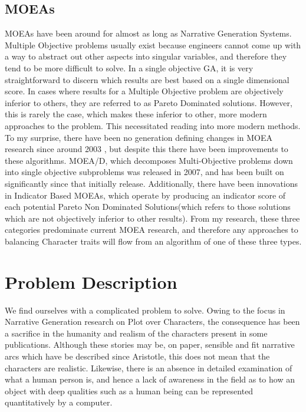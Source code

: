 \documentclass[11pt]{article}
\begin{document}
\subsection{MOEAs}
MOEAs have been around for almost as long as Narrative Generation Systems. Multiple Objective problems usually exist because engineers cannot come up with a way to abstract out other aspects into singular variables, and therefore they tend to be more difficult to solve. In a single objective GA, it is very straightforward to discern which results are best based on a single dimensional score. In cases where results for a Multiple Objective problem are objectively inferior to others, they are referred to as Pareto Dominated solutions. However, this is rarely the case, which makes these inferior to other, more modern approaches to the problem\cite{AchievementScalarazingIndicatorBased}. This necessitated reading into more modern methods. To my surprise, there have been no generation defining changes in MOEA research since around 2003 \cite{MOEASurvey1}, but despite this there have been improvements to these algorithms. MOEA/D, which decomposes Multi-Objective problems down into single objective subproblems \cite{MOEAD} was released in 2007, and has been built on significantly since that initially release. Additionally, there have been innovations in Indicator Based MOEAs, which operate by producing an indicator score of each potential Pareto Non Dominated Solutions(which refers to those solutions which are not objectively inferior to other results). From my research, these three categories predominate current MOEA research, and therefore any approaches to balancing Character traits will flow from an algorithm of one of these three types.


\section{Problem Description}
We find ourselves with a complicated problem to solve. Owing to the focus in Narrative Generation research on Plot over Characters, the consequence has been a sacrifice in the humanity and realism of the characters present in some publications. Although these stories may be, on paper, sensible and fit narrative arcs which have be described since Aristotle, this does not mean that the characters are realistic. Likewise, there is an absence in detailed examination of what a human person is, and hence a lack of awareness in the field as to how an object with deep qualities such as a human being can be represented quantitatively by a computer. 
\end{document}
